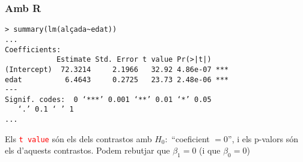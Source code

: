 \documentclass[12pt,t]{beamer}
\newcommand{\red}[1]{\textcolor{red}{#1}}
\theoremstyle{plain}
\theoremstyle{definition}
\begin{document}
\begin{frame}[fragile]
\frametitle{Amb R}
{\footnotesize \begin{verbatim}
> summary(lm(alçada~edat))
...
Coefficients:
            Estimate Std. Error t value Pr(>|t|)    
(Intercept)  72.3214     2.1966   32.92 4.86e-07 ***
edat          6.4643     0.2725   23.73 2.48e-06 ***
---
Signif. codes:  0 ‘***’ 0.001 ‘**’ 0.01 ‘*’ 0.05
   ‘.’ 0.1 ‘ ’ 1 
...
\end{verbatim}
}

Els \red{\texttt{t value}} són els dels contrastos amb $H_0:$ ``coeficient $=0$'', i els p-valors són els d'aquests
 contrastos. Podem rebutjar que $\beta_1=0$ (i que $\beta_0=0$)

\end{frame}
\end{document}

